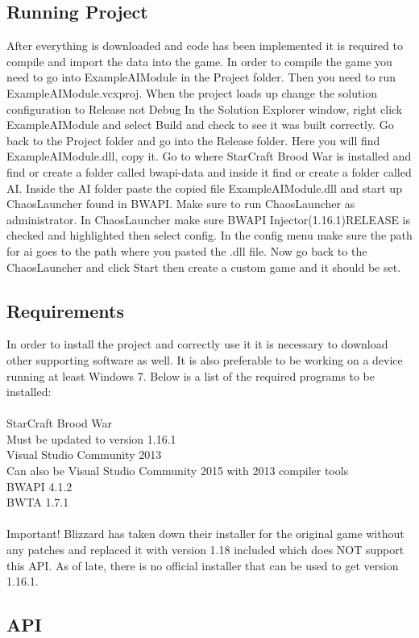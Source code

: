 \documentclass[10pt,letterpaper,onecolumn,draftclsnofoot]{IEEEtran}
\begin{document}
\subsection{Running Project}
After everything is downloaded and code has been implemented it is required to compile and import the data into the game. In order to compile the game you need to go into ExampleAIModule in the Project folder. Then you need to run ExampleAIModule.vcxproj. When the project loads up change the solution configuration to Release not Debug In the Solution Explorer window, right click ExampleAIModule and select Build and check to see it was built correctly. Go back to the Project folder and go into the Release folder. Here you will find ExampleAIModule.dll, copy it. Go to where StarCraft Brood War is installed and find or create a folder called bwapi-data and inside it find or create a folder called AI. Inside the AI folder paste the copied file ExampleAIModule.dll and start up ChaosLauncher found in BWAPI. Make sure to run ChaosLauncher as administrator. In ChaosLauncher make sure BWAPI Injector(1.16.1)RELEASE is checked and highlighted then select config. In the config menu make sure the path for ai goes to the path where you pasted the .dll file. Now go back to the ChaosLauncher and click Start then create a custom game and it should be set.
\subsection{Requirements}
In order to install the project and correctly use it it is necessary to download other supporting software as well. It is also preferable to be working on a device running at least Windows 7. Below is a list of the required programs to be installed:\\
\\
StarCraft Brood War\\
Must be updated to version 1.16.1\\
Visual Studio Community 2013\\
Can also be Visual Studio Community 2015 with 2013 compiler tools\\
BWAPI 4.1.2\\
BWTA 1.7.1\\
\\
Important! Blizzard has taken down their installer for the original game without any patches and replaced it with version 1.18 included which does NOT support this API. As of late, there is no official installer that can be used to get version 1.16.1.
\subsection{API}
\end{document}
